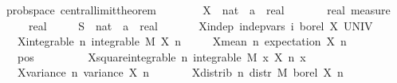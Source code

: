 \documentclass{article}
\begin{document}
\begin{isabellebody}
\isamarkupfalse%
\ {\isacharparenleft}\ prob{\isacharunderscore}space{\isacharparenright}\ central{\isacharunderscore}limit{\isacharunderscore}theorem{\isacharcolon}\isanewline
\ \ \ \isanewline
\ \ \ \ X\ {\isacharcolon}{\isacharcolon}\ {\isachardoublequoteopen}nat\ {\isasymRightarrow}\ {\isacharprime}a\ {\isasymRightarrow}\ real{\isachardoublequoteclose}\ \isanewline
\ \ \ \ {\isasymmu}\ {\isacharcolon}{\isacharcolon}\ {\isachardoublequoteopen}real\ measure{\isachardoublequoteclose}\ \isanewline
\ \ \ \ {\isasymsigma}{}\ {\isacharcolon}{\isacharcolon}\ real\ \isanewline
\ \ \ \ S\ {\isacharcolon}{\isacharcolon}\ {\isachardoublequoteopen}nat\ {\isasymRightarrow}\ {\isacharprime}a\ {\isasymRightarrow}\ real{\isachardoublequoteclose}\isanewline
\ \ \isanewline
\ \ \ \ X{\isacharunderscore}indep{\isacharcolon}\ {\isachardoublequoteopen}indep{\isacharunderscore}vars\ {\isacharparenleft}{\isasymlambda}i{\isachardot}\ borel{\isacharparenright}\ X\ UNIV{\isachardoublequoteclose}\ \isanewline
\ \ \ \ X{\isacharunderscore}integrable{\isacharcolon}\ {\isachardoublequoteopen}{\isasymAnd}n{\isachardot}\ integrable\ M\ {\isacharparenleft}X\ n{\isacharparenright}{\isachardoublequoteclose}\ \isanewline
\ \ \ \ X{\isacharunderscore}mean{\isacharunderscore}{}{\isacharcolon}\ {\isachardoublequoteopen}{\isasymAnd}n{\isachardot}\ expectation\ {\isacharparenleft}X\ n{\isacharparenright}\ {\isacharequal}\ {}{\isachardoublequoteclose}\ \isanewline
\ \ \ \ {\isasymsigma}{}{\isacharunderscore}pos{\isacharcolon}\ {\isachardoublequoteopen}{\isasymsigma}{}\ {\isachargreater}\ {}{\isachardoublequoteclose}\ \ \isanewline
\ \ \ \ X{\isacharunderscore}square{\isacharunderscore}integrable{\isacharcolon}\ {\isachardoublequoteopen}{\isasymAnd}n{\isachardot}\ integrable\ M\ {\isacharparenleft}{\isasymlambda}x{\isachardot}\ {\isacharparenleft}X\ n\ x{\isacharparenright}\ \isanewline
\ \ \ \ X{\isacharunderscore}variance{\isacharcolon}\ {\isachardoublequoteopen}{\isasymAnd}n{\isachardot}\ variance\ {\isacharparenleft}X\ n{\isacharparenright}\ {\isacharequal}\ {\isasymsigma}{}{\isachardoublequoteclose}\ \isanewline
\ \ \ \ X{\isacharunderscore}distrib{\isacharcolon}\ {\isachardoublequoteopen}{\isasymAnd}n{\isachardot}\ distr\ M\ borel\ {\isacharparenleft}X\ n{\isacharparenright}\ {\isacharequal}\ {\isasymmu}{\isachardoublequoteclose}\isanewline

\end{isabellebody}
\end{document}
